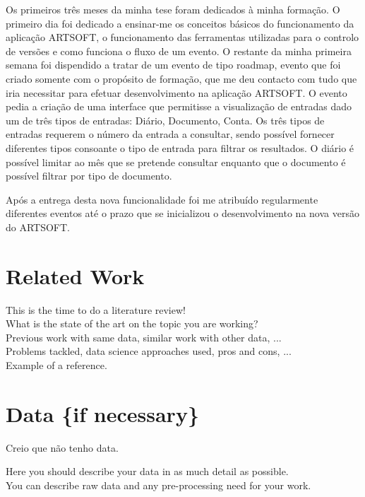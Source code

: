 \documentclass[sigplan]{acmart}
\begin{document}
Os primeiros três meses da minha tese foram dedicados à minha formação. O primeiro dia foi dedicado a ensinar-me os conceitos básicos do funcionamento da aplicação ARTSOFT, o funcionamento das ferramentas utilizadas para o controlo de versões e como funciona o fluxo de um evento. O restante da minha primeira semana foi dispendido a tratar de um evento de tipo roadmap, evento que foi criado somente com o propósito de formação, que me deu contacto com tudo que iria necessitar para efetuar desenvolvimento na aplicação ARTSOFT. O evento pedia a criação de uma interface que permitisse a visualização de entradas dado um de três tipos de entradas: Diário, Documento, Conta. Os três tipos de entradas requerem o número da entrada a consultar, sendo possível fornecer diferentes tipos consoante o tipo de entrada para filtrar os resultados. O diário é possível limitar ao mês que se pretende consultar enquanto que o documento é possível filtrar por tipo de documento. 

 Após a entrega desta nova funcionalidade foi me atribuído regularmente diferentes eventos até o prazo que se inicializou o desenvolvimento na nova versão do ARTSOFT.

\section{Related Work} \label{sec:relatedwork}

This is the time to do a literature review! \\

What is the state of the art on the topic you are working? \\

Previous work with same data, similar work with other data, ... \\

Problems tackled, data science approaches used, pros and cons, ... \\ 


Example of a reference\cite{subversion}.

\section{Data \{if necessary\} } \label{sec:data}

Creio que não tenho data.

Here you should describe your data in as much detail as possible. \\ 

You can describe raw data and any pre-processing need for your work. \\
\end{document}
